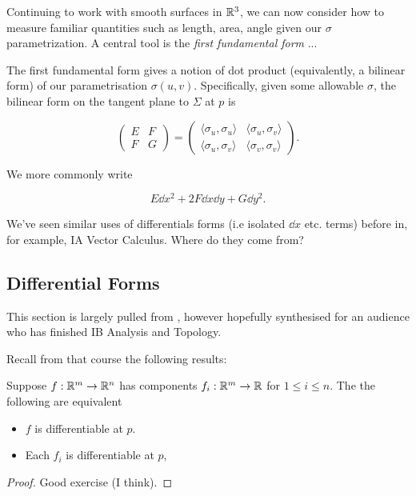 \documentclass[11pt]{scrartcl}
\begin{document}
Continuing to work with smooth surfaces in $\mathbb R^3$, we can now consider how to measure familiar quantities such as length, area, angle given our $\sigma$ parametrization. A central tool is the \textit{first fundamental form} ... 

The first fundamental form gives a notion of dot product (equivalently, a bilinear form) of our parametrisation $\sigma(u,v)$. Specifically, given some allowable $\sigma$, the bilinear form on the tangent plane to $\Sigma$ at $p$ is

\begin{equation}
    \begin{pmatrix} E & F \\ F & G \end{pmatrix} = \begin{pmatrix} \langle \sigma_u,\sigma_u \rangle & \langle \sigma_u,\sigma_v \rangle \\ \langle \sigma_u,\sigma_v \rangle & \langle \sigma_v,\sigma_v \rangle \end{pmatrix}.    
\end{equation}

We more commonly write

\begin{equation}
    E \dd x^2 + 2F \dd x \dd y + G \dd y^2.
\end{equation}

We've seen similar uses of differentials forms (i.e isolated $\dd x$ etc. terms) before in, for example, IA Vector Calculus. Where do they come from?

\subsection{Differential Forms}

This section is largely pulled from \cite{napkin}, however hopefully synthesised for an audience who has finished IB Analysis and Topology.

Recall from that course the following results:

\begin{theorem}

    Suppose $f : \mathbb R^m \rightarrow \mathbb R^n$ has components $f_i : \mathbb R^m \rightarrow \mathbb R$ for $1 \le i \le n$. The the following are equivalent

    \begin{itemize}
        \item $f$ is differentiable at $p$.
        \item Each $f_i$ is differentiable at $p$,
    \end{itemize}

    \begin{proof}
        Good exercise (I think).
    \end{proof}
\end{theorem}
\end{document}
